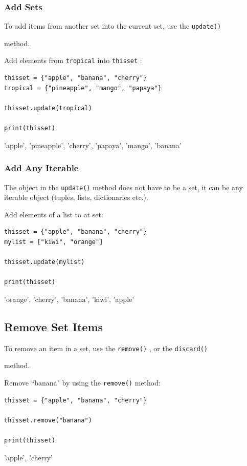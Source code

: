 \documentclass[12pt,a4paper]{article}
\newcommand{\code}[1]{%
	\colorbox{backcolour}{\lstinline{#1}}%
}
\newcommand{\lcode}[1]{%
	\lstinline{#1}%
}
\begin{document}
\subsubsection{Add Sets}

To add items from another set into the current set, use the \code{update()}
method.

\begin{ebox}
Add elements from \lcode{tropical} into \lcode{thisset}:
	\begin{lstlisting}
thisset = {"apple", "banana", "cherry"}
tropical = {"pineapple", "mango", "papaya"}

thisset.update(tropical)

print(thisset)
	\end{lstlisting}
\tcblower
	\begin{vercode}
{'apple', 'pineapple', 'cherry', 'papaya', 'mango', 'banana'}
	\end{vercode}
\end{ebox}
\subsubsection{Add Any Iterable}

The object in the \code{update()} method does not have to be a set, it can be
any iterable object (tuples, lists, dictionaries etc.).

\begin{ebox}
Add elements of a list to at set:
	\begin{lstlisting}
thisset = {"apple", "banana", "cherry"}
mylist = ["kiwi", "orange"]

thisset.update(mylist)

print(thisset)
	\end{lstlisting}
\tcblower
	\begin{vercode}
{'orange', 'cherry', 'banana', 'kiwi', 'apple'}
	\end{vercode}
\end{ebox}
\subsection{Remove Set Items}

To remove an item in a set, use the \code{remove()}, or the \code{discard()}
method.

\begin{ebox}
Remove ``banana" by using the \lcode{remove()} method:
	\begin{lstlisting}
thisset = {"apple", "banana", "cherry"}

thisset.remove("banana")

print(thisset) 
	\end{lstlisting}
\tcblower
	\begin{vercode}
{'apple', 'cherry'}
	\end{vercode}
\end{ebox}
\end{document}
